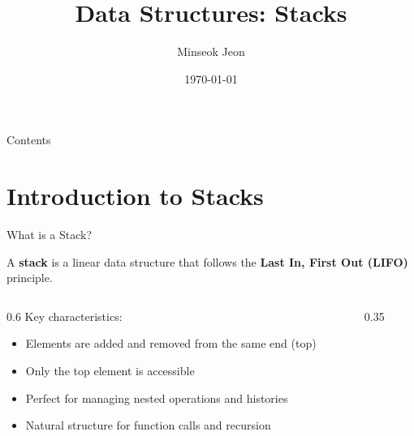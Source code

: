 \documentclass[aspectratio=169,xcolor=dvipsnames]{beamer}
\title[Stacks]{Data Structures: Stacks}
\author{Minseok Jeon}
\institute{DGIST}
\date{\today}
\begin{document}
\begin{frame}[plain]
  \titlepage
\end{frame}

\begin{frame}[plain]{Contents}
  \tableofcontents
\end{frame}

\section{Introduction to Stacks}

\begin{frame}{What is a Stack?}
  \begin{definition}
    A \textbf{stack} is a linear data structure that follows the \textbf{Last In, First Out (LIFO)} principle.
  \end{definition}
  
  \vspace{0.5cm}
  
  \begin{columns}
    \begin{column}{0.6\textwidth}
      Key characteristics:
      \begin{itemize}
        \item Elements are added and removed from the same end (top)
        \item Only the top element is accessible
        \item Perfect for managing nested operations and histories
        \item Natural structure for function calls and recursion
      \end{itemize}
    \end{column}
    \begin{column}{0.35\textwidth}
    \end{column}
  \end{columns}
\end{frame}
\end{document}
